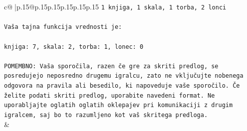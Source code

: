 \documentclass{article}
\begin{document}
{\begin{supertabular}{c@{$\;$}|p{.15\linewidth}@{}p{.15\linewidth}p{.15\linewidth}p{.15\linewidth}p{.15\linewidth}p{.15\linewidth}}
{{{\texttt{1 knjiga, 1 skala, 1 torba, 2 lonci} \\
\\ 
\texttt{Vaša tajna funkcija vrednosti je:} \\
\\ 
\texttt{knjiga: 7, skala: 2, torba: 1, lonec: 0} \\
\\ 
\texttt{POMEMBNO: Vaša sporočila, razen če gre za skriti predlog, se posredujejo neposredno drugemu igralcu, zato ne vključujte nobenega odgovora na pravila ali besedilo, ki napoveduje vaše sporočilo. Če želite podati skriti predlog, uporabite navedeni format. Ne uporabljajte oglatih oglatih oklepajev pri komunikaciji z drugim igralcem, saj bo to razumljeno kot vaš skritega predloga.} \\
            }
        }
    }
    & \\ \\


\end{supertabular}}
\end{document}
